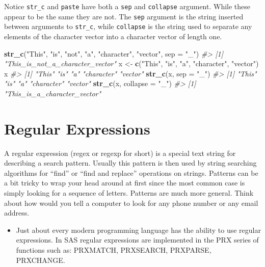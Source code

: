 \documentclass[]{book}
\newenvironment{Shaded}{\begin{snugshade}}{\end{snugshade}}
\newcommand{\KeywordTok}[1]{\textcolor[rgb]{0.13,0.29,0.53}{\textbf{#1}}}
\newcommand{\DataTypeTok}[1]{\textcolor[rgb]{0.13,0.29,0.53}{#1}}
\newcommand{\StringTok}[1]{\textcolor[rgb]{0.31,0.60,0.02}{#1}}
\newcommand{\CommentTok}[1]{\textcolor[rgb]{0.56,0.35,0.01}{\textit{#1}}}
\newcommand{\NormalTok}[1]{#1}
\newenvironment{rmdblock}[1]
  {\begin{shaded*}
  \begin{itemize}
  \renewcommand{\labelitemi}{
    \raisebox{-.7\height}[0pt][0pt]{
      {\setkeys{Gin}{width=3em,keepaspectratio}\texttt{[image: images/\#1]}}
    }
  }
  \item
  }
  {
  \end{itemize}
  \end{shaded*}
  }
\newenvironment{rmdnote}
  {\begin{rmdblock}{note}}
  {\end{rmdblock}}
\theoremstyle{definition}
\theoremstyle{definition}
\theoremstyle{definition}
\theoremstyle{remark}
\begin{document}
Notice \texttt{str\_c} and \texttt{paste} have both a \texttt{sep} and
\texttt{collapse} argument. While these appear to be the same they are
not. The \texttt{sep} argument is the string inserted between arguments
to \texttt{str\_c}, while \texttt{collapse} is the string used to
separate any elements of the character vector into a character vector of
length one.

\begin{Shaded}
\begin{Highlighting}[]
\KeywordTok{str_c}\NormalTok{(}\StringTok{"This"}\NormalTok{, }\StringTok{"is"}\NormalTok{, }\StringTok{"not"}\NormalTok{, }\StringTok{"a"}\NormalTok{, }\StringTok{"character"}\NormalTok{, }\StringTok{"vector"}\NormalTok{, }\DataTypeTok{sep =} \StringTok{"_"}\NormalTok{)}
\CommentTok{#> [1] "This_is_not_a_character_vector"}
\NormalTok{x <-}\StringTok{ }\KeywordTok{c}\NormalTok{(}\StringTok{"This"}\NormalTok{, }\StringTok{"is"}\NormalTok{, }\StringTok{"a"}\NormalTok{, }\StringTok{"character"}\NormalTok{, }\StringTok{"vector"}\NormalTok{)}
\NormalTok{x}
\CommentTok{#> [1] "This"      "is"        "a"         "character" "vector"}
\KeywordTok{str_c}\NormalTok{(x, }\DataTypeTok{sep =} \StringTok{"_"}\NormalTok{)}
\CommentTok{#> [1] "This"      "is"        "a"         "character" "vector"}
\KeywordTok{str_c}\NormalTok{(x, }\DataTypeTok{collapse =} \StringTok{"_"}\NormalTok{)}
\CommentTok{#> [1] "This_is_a_character_vector"}
\end{Highlighting}
\end{Shaded}

\section{Regular Expressions}\label{regular-expressions}

A regular expression (regex or regexp for short) is a special text
string for describing a search pattern. Usually this pattern is then
used by string searching algorithms for ``find'' or ``find and replace''
operations on strings. Patterns can be a bit tricky to wrap your head
around at first since the most common case is simply looking for a
sequence of letters. Patterns are much more general. Think about how
would you tell a computer to look for any phone number or any email
address.

\begin{rmdnote}
Just about every modern programming language has the ability to use
regular expressions. In SAS regular expressions are implemented in the
PRX series of functions such as: PRXMATCH, PRXSEARCH, PRXPARSE,
PRXCHANGE.
\end{rmdnote}
\end{document}
